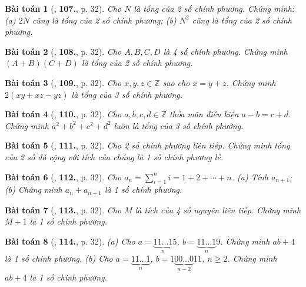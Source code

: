 \documentclass{article}
\numberwithin{equation}{section}
\newtheorem{baitoan}{Bài toán}
\begin{document}
\begin{baitoan}[\cite{Tuyen_Toan_8}, \textbf{107.}, p. 32]
	Cho $N$ là tổng của 2 số chính phương. Chứng minh: (a) $2N$ cũng là tổng của 2 số chính phương; (b) $N^2$ cũng là tổng của 2 số chính phương.
\end{baitoan}

\begin{baitoan}[\cite{Tuyen_Toan_8}, \textbf{108.}, p. 32]
	Cho $A,B,C,D$ là 4 số chính phương. Chứng minh $(A + B)(C + D)$ là tổng của 2 số chính phương.
\end{baitoan}

\begin{baitoan}[\cite{Tuyen_Toan_8}, \textbf{109.}, p. 32]
	Cho $x,y,z\in\mathbb{Z}$ sao cho $x = y + z$. Chứng minh $2(xy + xz - yz)$ là tổng của 3 số chính phương.
\end{baitoan}

\begin{baitoan}[\cite{Tuyen_Toan_8}, \textbf{110.}, p. 32]
	Cho $a,b,c,d\in\mathbb{Z}$ thỏa mãn điều kiện $a - b = c + d$. Chứng minh $a^2 + b^2 + c^2 + d^2$ luôn là tổng của 3 số chính phương.
\end{baitoan}

\begin{baitoan}[\cite{Tuyen_Toan_8}, \textbf{111.}, p. 32]
	Cho 2 số chính phương liên tiếp. Chứng minh tổng của 2 số đó cộng với tích của chúng là 1 số chính phương lẻ.
\end{baitoan}

\begin{baitoan}[\cite{Tuyen_Toan_8}, \textbf{112.}, p. 32]
	Cho $a_n = \sum_{i=1}^n i = 1 + 2 + \cdots + n$. (a) Tính $a_{n+1}$; (b) Chứng minh $a_n + a_{n+1}$ là 1 số chính phương.
\end{baitoan}

\begin{baitoan}[\cite{Tuyen_Toan_8}, \textbf{113.}, p. 32]
	Cho $M$ là tích của 4 số nguyên liên tiếp. Chứng minh $M + 1$ là 1 số chính phương.
\end{baitoan}

\begin{baitoan}[\cite{Tuyen_Toan_8}, \textbf{114.}, p. 32]
	(a) Cho $a = \underbrace{11\ldots1}_n5$, $b = \underbrace{11\ldots1}_n9$. Chứng minh $ab + 4$ là 1 số chính phương. (b) Cho $a = \underbrace{11\ldots1}_n$, $b = 1\underbrace{00\ldots0}_{n-2}11$, $n\ge 2$. Chứng minh $ab + 4$ là 1 số chính phương.
\end{baitoan}
\end{document}

